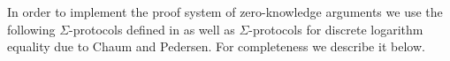 
In order to implement the proof system of zero-knowledge arguments we use the following $\Sigma$-protocols defined in \cite{fauzi2019quisquis} as well as $\Sigma$-protocols for discrete logarithm equality due to Chaum and Pedersen. For completeness we describe it below.



